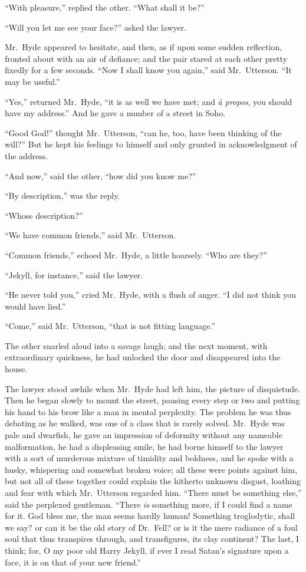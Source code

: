 \documentclass[12pt,openright]{book}
\begin{document}
“With pleasure,” replied the other. “What shall it be?”

“Will you let me see your face?” asked the lawyer.

Mr. Hyde appeared to hesitate, and then, as if upon some sudden reflection, fronted about with an air of defiance; and the pair stared at each other pretty fixedly for a few seconds. “Now I shall know you again,” said Mr. Utterson. “It may be useful.”

“Yes,” returned Mr. Hyde, “it is as well we have met; and \textit{à propos}, you should have my address.” And he gave a number of a street in Soho.

“Good God!” thought Mr. Utterson, “can he, too, have been thinking of the will?” But he kept his feelings to himself and only grunted in acknowledgment of the address.

“And now,” said the other, “how did you know me?”

“By description,” was the reply.

“Whose description?”

“We have common friends,” said Mr. Utterson.

“Common friends,” echoed Mr. Hyde, a little hoarsely. “Who are they?”

“Jekyll, for instance,” said the lawyer.

“He never told you,” cried Mr. Hyde, with a flush of anger. “I did not think you would have lied.”

“Come,” said Mr. Utterson, “that is not fitting language.”

The other snarled aloud into a savage laugh; and the next moment, with extraordinary quickness, he had unlocked the door and disappeared into the house.

The lawyer stood awhile when Mr. Hyde had left him, the picture of disquietude. Then he began slowly to mount the street, pausing every step or two and putting his hand to his brow like a man in mental perplexity. The problem he was thus debating as he walked, was one of a class that is rarely solved. Mr. Hyde was pale and dwarfish, he gave an impression of deformity without any nameable malformation, he had a displeasing smile, he had borne himself to the lawyer with a sort of murderous mixture of timidity and boldness, and he spoke with a husky, whispering and somewhat broken voice; all these were points against him, but not all of these together could explain the hitherto unknown disgust, loathing and fear with which Mr. Utterson regarded him. “There must be something else,” said the perplexed gentleman. “There \textit{is} something more, if I could find a name for it. God bless me, the man seems hardly human! Something troglodytic, shall we say? or can it be the old story of Dr. Fell? or is it the mere radiance of a foul soul that thus transpires through, and transfigures, its clay continent? The last, I think; for, O my poor old Harry Jekyll, if ever I read Satan’s signature upon a face, it is on that of your new friend.”
\end{document}
